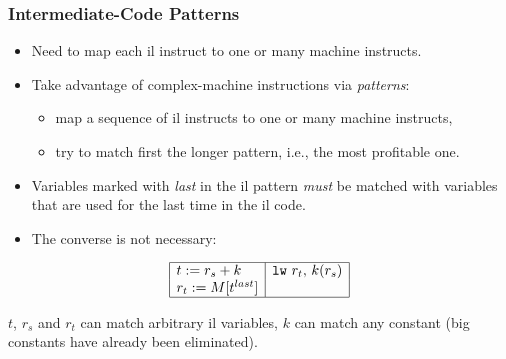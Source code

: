 \documentclass{beamer}
\renewcommand{\emph}[1]{\textcolor{structure}{#1}}
\newcommand{\emp}[1]{\textcolor{DikuRed}{ #1}}
\begin{document}
\begin{frame}[fragile,t]
   \frametitle{Intermediate-Code Patterns}

\bigskip

\begin{itemize}

    \item Need to map \emph{each {\sc il} instruct} to one or many machine instructs.\smallskip

    \item Take advantage of complex-machine instructions via \emp{\em patterns}:
            \begin{itemize}
                \item map \emp{a sequence of {\sc il} instructs} to one or many machine instructs,
                \item try to match first the longer pattern, i.e., the most profitable one.\smallskip
            \end{itemize}

    \item Variables marked with {\em last} in the {\sc il} pattern {\em must} be matched
            with variables that are used for the last time in the il code.\smallskip

    \item The converse is not necessary:

\end{itemize}

\[ \begin{array}{|l|l|}\hline
t := r_s + k & \mbox{\tt lw}~r_t,\,k(r_s) \\
r_t := M[t^{last}] &\\\hline
\end{array}\]

\smallskip

$t$, $r_s$ and $r_t$ can match arbitrary {\sc il} variables, $k$ can match any constant 
(big constants have already been eliminated).

\end{frame}
\end{document}

